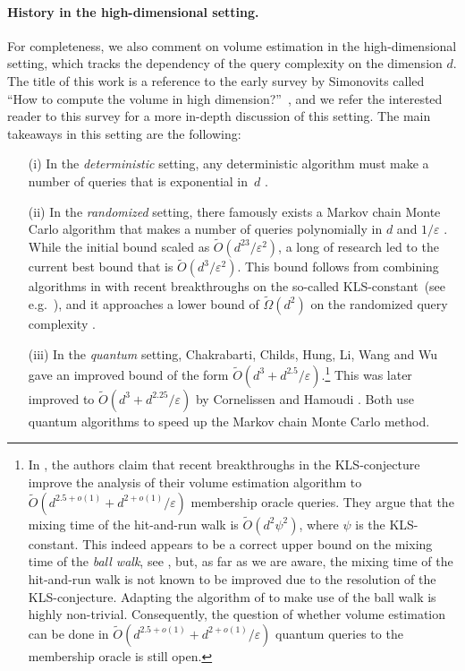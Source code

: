 \documentclass[11pt]{article}
\begin{document}
    \paragraph{History in the high-dimensional setting.}
    For completeness, we also comment on volume estimation in the high-dimensional setting, which tracks the dependency of the query complexity on the dimension $d$. The title of this work is a reference to the early survey by Simonovits called ``How to compute the volume in high dimension?''~\cite{simonovits2003compute}, and we refer the interested reader to this survey for a more in-depth discussion of this setting.
    The main takeaways in this setting are the following:
    \begin{itemize}
        \item[(i)]
        In the \emph{deterministic} setting, any deterministic algorithm must make a number of queries that is exponential in~$d$ \cite{elekes1986geometric,barany1987computing}.
        \item[(ii)]
        In the \emph{randomized} setting, there famously exists a Markov chain Monte Carlo algorithm that makes a number of queries polynomially in $d$ and $1/\varepsilon$ \cite{dyer1991random}.
        While the initial bound scaled as $\widetilde{O}(d^{23}/\varepsilon^2)$, a long of research led to the current best bound that is $\widetilde{O}(d^3/\varepsilon^2)$.
        This bound follows from combining algorithms in \cite{CV18,jia2021reducing} with recent breakthroughs on the so-called KLS-constant~(see e.g.~\cite{klartag2022bourgain}), and it approaches a lower bound of $\widetilde{\Omega}(d^2)$ on the randomized query complexity \cite{rademacher2008dispersion}.
        \item[(iii)] In the \emph{quantum} setting, Chakrabarti, Childs, Hung, Li, Wang and Wu \cite{chakrabarti2023quantum} gave an improved bound of the form $\widetilde{O}(d^3 + d^{2.5}/\varepsilon)$.\footnote{In \cite[Page~20:11]{chakrabarti2023quantum}, the authors claim that recent breakthroughs in the KLS-conjecture~\cite{chen2021almost,jambulapati2022slightly,klartag2023logarithmic} improve the analysis of their volume estimation algorithm to $\widetilde{O}(d^{2.5+o(1)} + d^{2+o(1)}/\varepsilon)$ membership oracle queries. They argue that the mixing time of the hit-and-run walk is $\widetilde{O}(d^2\psi^2)$, where $\psi$ is the KLS-constant. This indeed appears to be a correct upper bound on the mixing time of the \textit{ball walk}, see \cite[Theorem~2.7]{jia2021reducing}, but, as far as we are aware, the mixing time of the hit-and-run walk is not known to be improved due to the resolution of the KLS-conjecture. Adapting the algorithm of \cite{chakrabarti2023quantum} to make use of the ball walk is highly non-trivial. Consequently, the question of whether volume estimation can be done in $\widetilde{O}(d^{2.5+o(1)} + d^{2+o(1)}/\varepsilon)$ quantum queries to the membership oracle is still open.} This was later improved to $\widetilde{O}(d^3 + d^{2.25}/\varepsilon)$ by Cornelissen and Hamoudi \cite{cornelissen2023sublinear}. Both use quantum algorithms to speed up the Markov chain Monte Carlo method.

\end{itemize}
\end{document}
